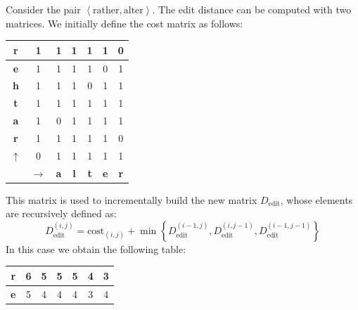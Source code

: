 \begin{example}
    Consider the pair $\left\langle \text{rather},\text{alter} \right\rangle$. 
    The edit distance can be computed with two matrices. 
    We initially define the cost matrix as follows: 
    \begin{table}[H]
        \centering
        \begin{tabular}{c|c|c|c|c|c|c|}
        \hline
        \multicolumn{1}{|c|}{\textbf{r}} & 1         & 1          & 1          & 1          & 1          & 0          \\ \hline
        \multicolumn{1}{|c|}{\textbf{e}} & 1         & 1          & 1          & 1          & 0          & 1          \\ \hline
        \multicolumn{1}{|c|}{\textbf{h}} & 1         & 1          & 1          & 0          & 1          & 1          \\ \hline
        \multicolumn{1}{|c|}{\textbf{t}} & 1         & 1          & 1          & 1          & 1          & 1          \\ \hline
        \multicolumn{1}{|c|}{\textbf{a}} & 1         & 0          & 1          & 1          & 1          & 1          \\ \hline
        \multicolumn{1}{|c|}{\textbf{r}} & 1         & 1          & 1          & 1          & 1          & 0          \\ \hline
        \multicolumn{1}{|c|}{$\uparrow$}& 0         & 1          & 1          & 1          & 1          & 1          \\ \hline
                                         & $\rightarrow$ & \textbf{a} & \textbf{l} & \textbf{t} & \textbf{e} & \textbf{r} \\ \cline{2-7} 
        \end{tabular}
    \end{table}
    This matrix is used to incrementally build the new matrix $D_{\text{edit}}$, whose elements are recursively defined as:
    \[D_{\text{edit}}^{(i,j)}=\text{cost}_{(i,j)}+\min\left\{D_{\text{edit}}^{(i-1,j)},D_{\text{edit}}^{(i,j-1)},D_{\text{edit}}^{(i-1,j-1)}\right\}\]
    In this case we obtain the following table: 
    \begin{table}[H]
        \centering
        \begin{tabular}{c|c|c|c|c|c|c|}
        \hline
        \multicolumn{1}{|c|}{\textbf{r}}          & 6                      & 5          & 5          & 5          & 4          & 3          \\ \hline
        \multicolumn{1}{|c|}{\textbf{e}}          & 5                      & 4          & 4          & 4          & 3          & 4          \\ \hline

\end{tabular}
\end{table}
\end{example}
